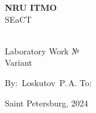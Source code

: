 \documentclass[12pt]{article}
\begin{document}
	\begin{center}
		\thispagestyle{empty}
		\LARGE
		\textbf{NRU ITMO}\\
		SEaCT\\
		
		\vspace{7cm}
		
		\huge
		
		\textbf{}\\
		Laboratory Work №\\
		\vspace{1cm}
		\Large
		Variant 
		
		\LARGE
		\vspace{5cm}
		\vbox{
			\hfill
			\vbox{
				\hbox{By: Loskutov P.\,A.}
				\hbox{To: }
			}
		} 
		
		\vspace{2.5cm}
		Saint Petersburg, 2024
		\newpage
		\tableofcontents
	\end{center}
	\newpage
\end{document}
